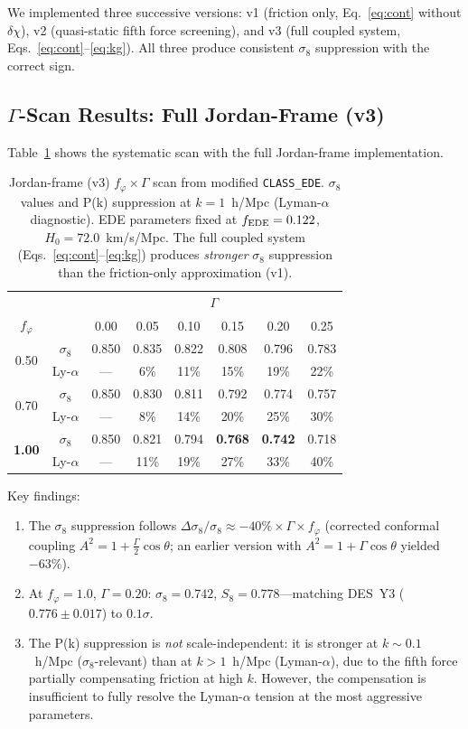 \documentclass[a4paper,11pt]{article}
\newcommand{\chif}{\chi}
\newcommand{\fphi}{f_\varphi}
\begin{document}
We implemented three successive versions: v1 (friction only, Eq.~\ref{eq:cont} without $\delta\chif$), v2 (quasi-static fifth force screening), and v3 (full coupled system, Eqs.~\ref{eq:cont}--\ref{eq:kg}). All three produce consistent $\sigma_8$ suppression with the correct sign.

\subsection{$\Gamma$-Scan Results: Full Jordan-Frame (v3)}

Table~\ref{tab:gammascan} shows the systematic scan with the full Jordan-frame implementation.

\begin{table}[h!]
\centering
\begin{tabular}{cc|cccccc}
\toprule
& & \multicolumn{6}{c}{$\Gamma$} \\
$\fphi$ & & 0.00 & 0.05 & 0.10 & 0.15 & 0.20 & 0.25 \\
\midrule
\multirow{2}{*}{0.50} & $\sigma_8$ & 0.850 & 0.835 & 0.822 & 0.808 & 0.796 & 0.783 \\
 & Ly-$\alpha$ & --- & 6\% & 11\% & 15\% & 19\% & 22\% \\
\midrule
\multirow{2}{*}{0.70} & $\sigma_8$ & 0.850 & 0.830 & 0.811 & 0.792 & 0.774 & 0.757 \\
 & Ly-$\alpha$ & --- & 8\% & 14\% & 20\% & 25\% & 30\% \\
\midrule
\multirow{2}{*}{\textbf{1.00}} & $\sigma_8$ & 0.850 & 0.821 & 0.794 & \textbf{0.768} & \textbf{0.742} & 0.718 \\
 & Ly-$\alpha$ & --- & 11\% & 19\% & 27\% & 33\% & 40\% \\
\bottomrule
\end{tabular}
\caption{Jordan-frame (v3) $\fphi \times \Gamma$ scan from modified \texttt{CLASS\_EDE}. $\sigma_8$ values and P(k) suppression at $k = 1$~h/Mpc (Lyman-$\alpha$ diagnostic). EDE parameters fixed at $f_{\rm EDE} = 0.122$, $H_0 = 72.0$~km/s/Mpc. The full coupled system (Eqs.~\ref{eq:cont}--\ref{eq:kg}) produces \textit{stronger} $\sigma_8$ suppression than the friction-only approximation (v1).}
\label{tab:gammascan}
\end{table}

\noindent Key findings:
\begin{enumerate}[nosep]
\item The $\sigma_8$ suppression follows $\Delta\sigma_8/\sigma_8 \approx -40\% \times \Gamma \times \fphi$ (corrected conformal coupling $A^2 = 1 + \tfrac{\Gamma}{2}\cos\theta$; an earlier version with $A^2 = 1 + \Gamma\cos\theta$ yielded $-63\%$).
\item At $\fphi = 1.0$, $\Gamma = 0.20$: $\sigma_8 = 0.742$, $S_8 = 0.778$---matching DES~Y3 ($0.776 \pm 0.017$) to $0.1\sigma$.
\item The P(k) suppression is \textit{not} scale-independent: it is stronger at $k \sim 0.1$~h/Mpc ($\sigma_8$-relevant) than at $k > 1$~h/Mpc (Lyman-$\alpha$), due to the fifth force partially compensating friction at high $k$. However, the compensation is insufficient to fully resolve the Lyman-$\alpha$ tension at the most aggressive parameters.
\end{enumerate}
\end{document}
